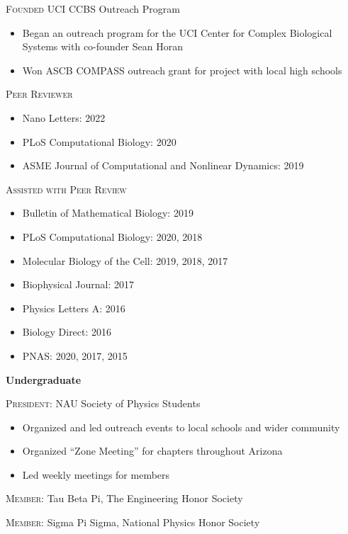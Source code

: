 \documentclass[letterpaper,10pt]{article} %
\begin{document}
\textsc{Founded} UCI CCBS Outreach Program
\begin{itemize}
\item Began an outreach program for the UCI Center for Complex Biological Systems with co-founder Sean Horan
\item Won ASCB COMPASS outreach grant for project with local high schools
\end{itemize}

\textsc{Peer Reviewer}
\begin{itemize}
\item Nano Letters: 2022
\item PLoS Computational Biology: 2020
\item ASME Journal of Computational and Nonlinear Dynamics: 2019
\end{itemize}

\textsc{Assisted with Peer Review}
\begin{itemize}
\item Bulletin of Mathematical Biology: 2019
\item PLoS Computational Biology: 2020, 2018
\item Molecular Biology of the Cell: 2019, 2018, 2017
\item Biophysical Journal: 2017
\item Physics Letters A: 2016
\item Biology Direct: 2016
\item PNAS: 2020, 2017, 2015
\end{itemize}

\bigskip

{\large \textbf{Undergraduate}}

\textsc{President:} NAU Society of Physics Students
\begin{itemize}
\item Organized and led outreach events to local schools and wider community
\item Organized ``Zone Meeting'' for chapters throughout Arizona
\item Led weekly meetings for members
\end{itemize}

\textsc{Member:} Tau Beta Pi, The Engineering Honor Society

\textsc{Member:} Sigma Pi Sigma, National Physics Honor Society

\bigskip
\end{document}
